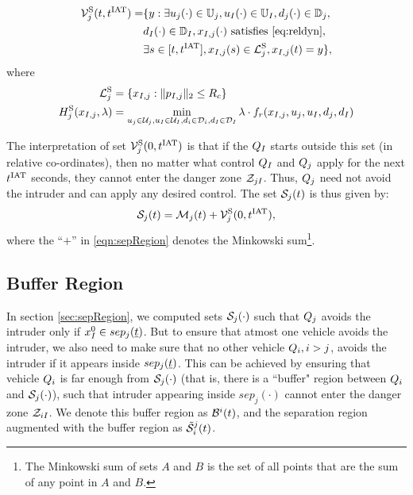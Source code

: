 \begin{equation} \label{eqn:optAvoid}
\begin{aligned}
\brs^{\text{S}}_{j}(t, \iat) = & \{y: \exists \ctrl_j(\cdot) \in \cfset_j, \ctrl_\intr(\cdot) \in \cfset_\intr, \dstb_j(\cdot) \in \dfset_j, \\
& \dstb_\intr(\cdot) \in \dfset_\intr, \state_{\intr, j}(\cdot) \text{ satisfies \eqref{eq:reldyn}},\\
& \exists s \in [t, \iat], \state_{\intr, j}(s) \in \targetset^{\text{S}}_{j}, \state_{\intr, j}(t) = y\},
\end{aligned}
\end{equation}
where 
\begin{equation}
\begin{aligned}
\mathcal{L}^{\text{S}}_{j} &= \{x_{I, j}: \|p_{I, j}\|_2 \le R_c\} \\
H^{\text{S}}_{j}(x_{I, j}, \lambda) &= \min_{u_j \in \mathcal{U}_j, u_I \in \mathcal{U}_I, d_i \in \mathcal{D}_i, d_I \in \mathcal{D}_I} \lambda \cdot f_r(x_{I, j}, u_j, u_I, d_j, d_I)
\end{aligned}
\end{equation}

The interpretation of set $\mathcal{V}^{\text{S}}_{j}(0, t^\text{IAT})$ is that if the $Q_{I}$ starts outside this set (in relative co-ordinates), then no matter what control $Q_{I}$ and $Q_{j}$ apply for the next $t^\text{IAT}$ seconds, they cannot enter the danger zone $\mathcal{Z}_{jI}$. Thus, $Q_{j}$ need not avoid the intruder and can apply any desired control. The set $\mathcal{S}_j(t)$ is thus given by:
\begin{equation} \label{eqn:sepRegion}
\sep_j(t) = \boset_j(t) + \brs^{\text{S}}_{j}(0, \iat),
\end{equation}
where the ``$+$'' in \eqref{eqn:sepRegion} denotes the Minkowski sum\footnote{The Minkowski sum of sets $A$ and $B$ is the set of all points that are the sum of any point in $A$ and $B$.}.

\subsection{Buffer Region} \label{sec:buffRegion}
In section \ref{sec:sepRegion}, we computed sets $\mathcal{S}_j(\cdot)$ such that $Q_j$ avoids the intruder only if $x_{I}^0 \in sep_j(\underline{t})$. But to ensure that atmost one vehicle avoids the intruder, we also need to make sure that no other vehicle $Q_i, i>j$, avoids the intruder if it appears inside $sep_j(\underline{t})$. This can be achieved by ensuring that vehicle $Q_i$ is far enough from $\mathcal{S}_j(\cdot)$ (that is, there is a ``buffer" region between $Q_i$ and $\mathcal{S}_j(\cdot)$), such that intruder appearing inside $sep_j(\cdot)$ cannot enter the danger zone $\mathcal{Z}_{iI}$. We denote this buffer region as $\mathcal{B}^i(t)$, and the separation region augmented with the buffer region as $\tilde{\mathcal{S}}^j_i(t)$.

